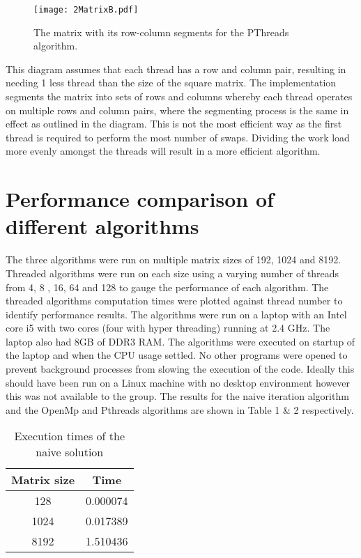 \documentclass[10pt,onecolumn]{article}
\begin{document}
\begin{figure}[h!]
\centering
\texttt{[image: 2MatrixB.pdf]}
\centering
\caption{The matrix with its row-column segments for the PThreads algorithm.}
\end{figure}

\noindent This diagram assumes that each thread has a row and column pair, resulting in needing 1 less thread than the size of the square matrix. The implementation segments the matrix into sets of rows and columns whereby each thread operates on multiple rows and column pairs, where the segmenting process is the same in effect as outlined in the diagram. This is not the most efficient way as the first thread is required to perform the most number of swaps. Dividing the work load more evenly amongst the threads will result in a more efficient algorithm. 

\section{Performance comparison of different algorithms}
The three algorithms were run on multiple matrix sizes of 192, 1024 and 8192. Threaded algorithms were run on each size using a varying number of threads from 4, 8 , 16, 64 and 128 to gauge the performance of each algorithm. The threaded algorithms computation times were plotted against thread number to identify performance results. The algorithms were run on a laptop with an Intel core i5 with two cores (four with hyper threading) running at 2.4 GHz. The laptop also had 8GB of DDR3 RAM. The algorithms were executed on startup of the laptop and when the CPU usage settled. No other programs were opened to prevent background processes from slowing the execution of the code. Ideally this should have been run on a Linux machine with no desktop environment however this was not available to the group. The results for the naive iteration algorithm and the OpenMp and Pthreads algorithms are shown in Table 1 \& 2 respectively.

\begin{table}[htpb!]
\centering
\caption{Execution times of the naive solution}
\label{my-label}
\begin{tabular}{|c|c|}
\hline
\textbf{Matrix size} & \textbf{Time} \\ \hline
128                  & 0.000074      \\ \hline
1024                 & 0.017389      \\ \hline
8192                 & 1.510436      \\ \hline
\end{tabular}
\end{table}
\end{document}
